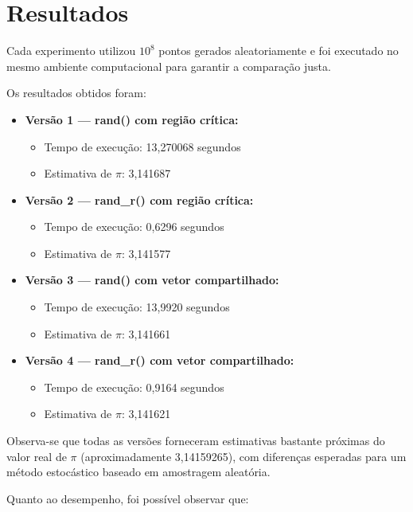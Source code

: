 \documentclass[a4paper, 12pt]{article}
\begin{document}
	\section{Resultados}
	 Cada experimento utilizou $10^8$ pontos gerados aleatoriamente e foi executado no mesmo ambiente computacional para garantir a comparação justa.
	
	Os resultados obtidos foram:
	
	\begin{itemize}
		\item \textbf{Versão 1 — rand() com região crítica:}
		\begin{itemize}
			\item Tempo de execução: 13,270068 segundos
			\item Estimativa de $\pi$: 3,141687
		\end{itemize}
		
		\item \textbf{Versão 2 — rand\_r() com região crítica:}
		\begin{itemize}
			\item Tempo de execução: 0,6296 segundos
			\item Estimativa de $\pi$: 3,141577
		\end{itemize}
		
		\item \textbf{Versão 3 — rand() com vetor compartilhado:}
		\begin{itemize}
			\item Tempo de execução: 13,9920 segundos
			\item Estimativa de $\pi$: 3,141661
		\end{itemize}
		
		\item \textbf{Versão 4 — rand\_r() com vetor compartilhado:}
		\begin{itemize}
			\item Tempo de execução: 0,9164 segundos
			\item Estimativa de $\pi$: 3,141621
		\end{itemize}
	\end{itemize}
	
	Observa-se que todas as versões forneceram estimativas bastante próximas do valor real de $\pi$ (aproximadamente 3,14159265), com diferenças esperadas para um método estocástico baseado em amostragem aleatória.
	
	Quanto ao desempenho, foi possível observar que:
	
\end{document}
